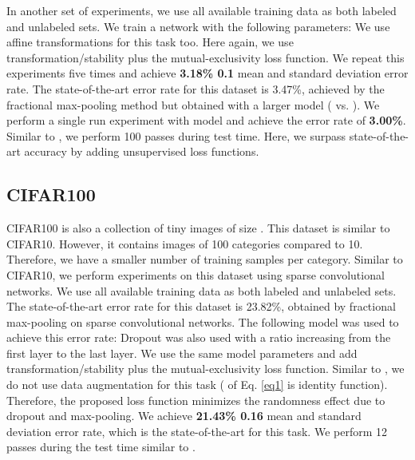 \documentclass{article}
\begin{document}
In another set of experiments, we use all available training data as both labeled and unlabeled sets. We train a network with the following parameters:  We use affine transformations for this task too. Here again, we use transformation/stability plus the mutual-exclusivity loss function. We repeat this experiments five times and achieve {\bf 3.18\%  0.1} mean and standard deviation error rate. The state-of-the-art error rate for this dataset is 3.47\%, achieved by the fractional max-pooling method \cite{graham2014fractional} but obtained with a larger model ( vs. ). We perform a single run experiment with  model and achieve the error rate of {\bf 3.00\%}. Similar to \cite{graham2014fractional}, we perform 100 passes during test time. Here, we surpass state-of-the-art accuracy by adding unsupervised loss functions.
\vspace{-0.2cm}
\subsection{CIFAR100}
\vspace{-0.1cm}
CIFAR100 is also a collection of  tiny images of size . This dataset is similar to CIFAR10. However, it contains images of 100 categories compared to 10. Therefore, we have a smaller number of training samples per category. Similar to CIFAR10, we perform experiments on this dataset using sparse convolutional networks. We use all available training data as both labeled and unlabeled sets. The state-of-the-art error rate for this dataset is 23.82\%, obtained by fractional max-pooling \cite{graham2014fractional} on sparse convolutional networks. The following model was used to achieve this error rate:  Dropout was also used with a ratio increasing from the first layer to the last layer. We use the same model parameters and add transformation/stability plus the mutual-exclusivity loss function. Similar to \cite{graham2014fractional}, we do not use data augmentation for this task ( of Eq. \ref{eq1} is identity function). Therefore, the proposed loss function minimizes the randomness effect due to dropout and max-pooling. We achieve {\bf 21.43\%  0.16} mean and standard deviation error rate, which is the state-of-the-art for this task. We perform 12 passes during the test time similar to \cite{graham2014fractional}.
\vspace{-0.2cm}
\end{document}
